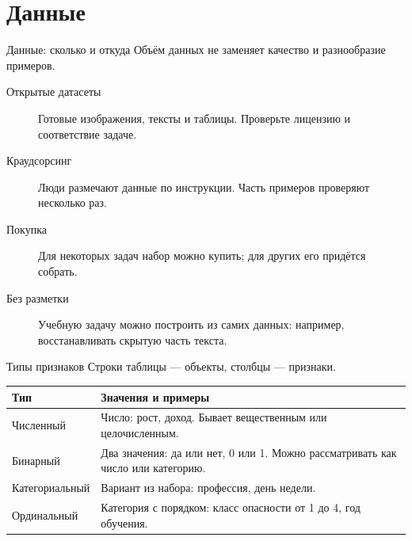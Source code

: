 \section{Данные}

\begin{frame}{Данные: сколько и откуда}
  Объём данных не заменяет качество и разнообразие примеров.
  \begin{description}
    \item[Открытые датасеты] Готовые изображения, тексты и таблицы.
      Проверьте лицензию и соответствие задаче.
    \item[Краудсорсинг] Люди размечают данные по инструкции.
      Часть примеров проверяют несколько раз.
    \item[Покупка] Для некоторых задач набор можно купить; для других его придётся собрать.
    \item[Без разметки] Учебную задачу можно построить из самих данных:
      например, восстанавливать скрытую часть текста.
  \end{description}
\end{frame}

\begin{frame}{Типы признаков}
  Строки таблицы --- объекты, столбцы --- признаки.
  \medskip\par
  \begin{tabularx}{\linewidth}{@{}l Y@{}}
    \toprule
    \textbf{Тип} & \textbf{Значения и примеры}\\
    \midrule
    Численный & Число: рост, доход. Бывает вещественным или целочисленным.\\
    Бинарный & Два значения: да или нет, 0 или 1. Можно рассматривать как число или категорию.\\
    Категориальный & Вариант из набора: профессия, день недели.\\
    Ординальный & Категория с порядком: класс опасности от 1 до 4, год обучения.\\
    \bottomrule
  \end{tabularx}
\end{frame}

